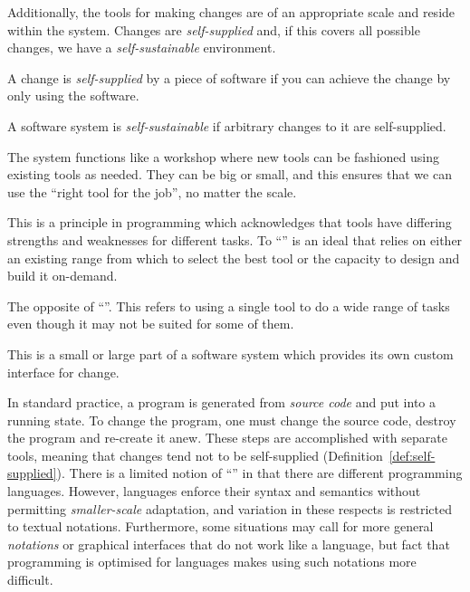 Additionally, the tools for making changes are of an appropriate scale
and reside within the system. Changes are \emph{self-supplied} and, if
this covers all possible changes, we have a \emph{self-sustainable}
environment.

\begin{defn}
\label{def:self-supplied}
A change is \emph{self-supplied} by a piece of software if you can achieve the change by only using the software.
\end{defn}

\begin{defn}
\label{def:self-sustainable}
A software system is \emph{self-sustainable} if arbitrary changes to it are self-supplied.
\end{defn}

The system functions like a workshop where new tools can be fashioned
using existing tools as needed. They can be big or small, and this
ensures that we can use the ``right tool for the job'', no matter the
scale.

\begin{defn}[\RTFJ]
\label{def:right-tool}
This is a principle in programming which acknowledges that tools have differing strengths and weaknesses for different tasks. To ``\URTFJ'' is an ideal that relies on either an existing range from which to select the best tool or the capacity to design and build it on-demand.
\end{defn}

\begin{defn}
\label{def:osfa}
The opposite of ``\URTFJ''. This refers to using a single tool to do a wide range of tasks even though it may not be suited for some of them.
\end{defn}

\begin{defn}
\label{def:dsa}
This is a small or large part of a software system which provides its own custom interface for change.
\end{defn}

In standard practice, a program is generated from \emph{source code} and
put into a running state. To change the program, one must change the
source code, destroy the program and re-create it anew. These steps are
accomplished with separate tools, meaning that changes tend not to be
self-supplied (Definition~\ref{def:self-supplied}). There is a limited
notion of ``\URTFJ'' in that there are different programming languages.
However, languages enforce their syntax and semantics without permitting
\emph{smaller-scale} adaptation, and variation in these respects is
restricted to textual notations. Furthermore, some situations may call
for more general \emph{notations} or graphical interfaces that do not
work like a language, but fact that programming is optimised for
languages makes using such notations more difficult.

